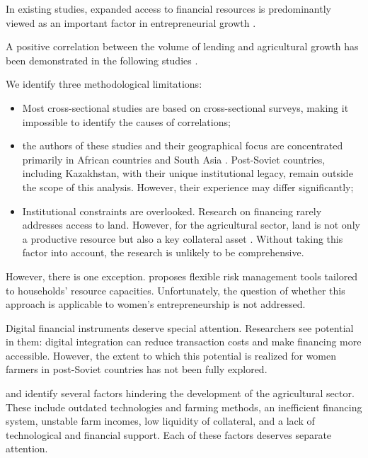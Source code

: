 \documentclass[pdflatex,sn-mathphys-ay]{sn-jnl}
\begin{document}
In existing studies, expanded access to financial resources is
predominantly viewed as an important factor in entrepreneurial growth
\citep{ref103}.

A positive correlation between the volume of lending and agricultural
growth has been demonstrated in the following studies
\citep{ref94,ref99,ref70,ref49,ref95,ref97,ref61}.

We identify three methodological limitations:

\begin{itemize}
\item Most cross-sectional studies are based on cross-sectional
surveys, making it impossible to identify the causes of correlations;
\item the authors of these studies and their geographical focus are
concentrated primarily in African countries and South Asia
\citep{ref90,ref58,ref42,ref71,ref44,ref97,ref84}. Post-Soviet countries, including Kazakhstan, with their
unique institutional legacy, remain outside the scope of this analysis.
However, their experience may differ significantly;
\item Institutional constraints are overlooked. Research on financing
rarely addresses access to land. However, for the agricultural sector,
land is not only a productive resource but also a key collateral asset
\citep{ref20,ref06}. Without taking this factor into
account, the research is unlikely to be comprehensive.
\end{itemize}

However, there is one exception. \citet{ref18} proposes
flexible risk management tools tailored to households' resource
capacities. Unfortunately, the question of whether this approach is
applicable to women's entrepreneurship is not addressed.

Digital financial instruments deserve special attention. Researchers see
potential in them: digital integration can reduce transaction costs and
make financing more accessible. However, the extent to which this
potential is realized for women farmers in post-Soviet countries has not
been fully explored.

\citet{ref63} and \citet{ref76} identify several factors
hindering the development of the agricultural sector. These include
outdated technologies and farming methods, an inefficient financing
system, unstable farm incomes, low liquidity of collateral, and a lack
of technological and financial support. Each of these factors deserves
separate attention.
\end{document}
